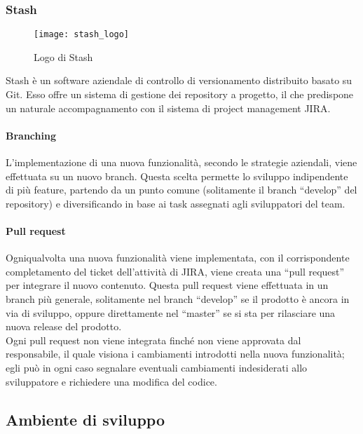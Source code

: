 \subsubsection{Stash}
\begin{figure}[htb] 
    \centering 
    \texttt{[image: stash\_logo]} 
    \caption{Logo di Stash}
\end{figure}
Stash è un software aziendale di controllo di versionamento distribuito basato su Git. 
Esso offre un sistema di gestione dei repository a progetto, il che predispone un naturale accompagnamento con il sistema di project management JIRA.

\paragraph{Branching}
L’implementazione di una nuova funzionalità, secondo le strategie aziendali, viene effettuata su un nuovo branch. Questa scelta permette lo sviluppo indipendente di più feature, partendo da un punto comune (solitamente il branch “develop” del repository) e diversificando in base ai task assegnati agli sviluppatori del team.

\paragraph{Pull request}
Ogniqualvolta una nuova funzionalità viene implementata, con il corrispondente completamento del ticket dell’attività di JIRA, viene creata una “pull request” per integrare il nuovo contenuto. Questa pull request viene effettuata in un branch più generale, solitamente nel branch “develop” se il prodotto è ancora in via di sviluppo, oppure direttamente nel “master” se si sta per rilasciare una nuova release del prodotto.\\
Ogni pull request non viene integrata finché non viene approvata dal responsabile, il quale visiona i cambiamenti introdotti nella nuova funzionalità; egli può in ogni caso segnalare eventuali cambiamenti indesiderati allo sviluppatore e richiedere una modifica del codice.

\subsection{Ambiente di sviluppo}

